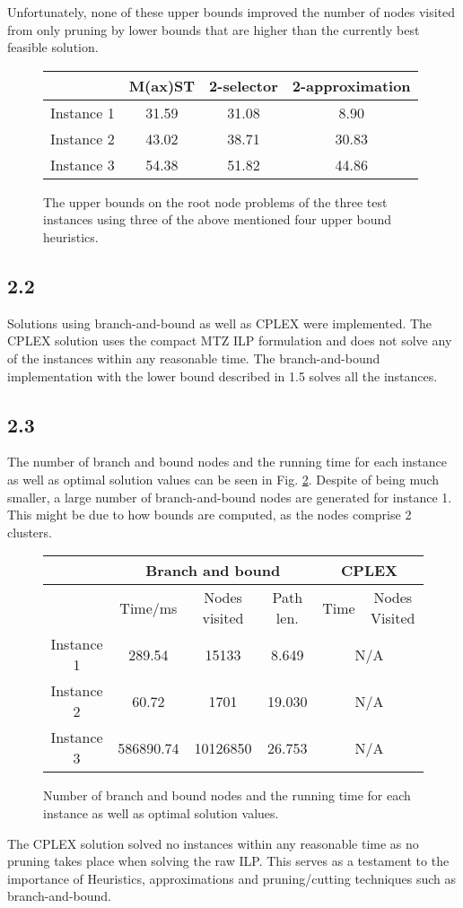 \documentclass[12pt]{article}
\begin{document}
Unfortunately, none of these upper bounds improved the number of nodes visited from only pruning by lower bounds that are higher than the currently best feasible solution. 
\begin{figure}[!hbt]
\center
\begin{tabular}{|c|c|c|c|}
\hline
&M(ax)ST & 2-selector & 2-approximation\\
\hline
Instance 1 & 31.59 & 31.08 & 8.90 \\
\hline
Instance 2 & 43.02 & 38.71 & 30.83\\
\hline
Instance 3 & 54.38 & 51.82 & 44.86\\
\hline
\end{tabular}
\caption{The upper bounds on the root node problems of the three test instances using three of the above mentioned four upper bound heuristics.\label{upperbounds}}
\end{figure}

\subsection*{2.2}
Solutions using branch-and-bound as well as CPLEX were implemented. The CPLEX solution uses the compact MTZ ILP formulation and does not solve any of the instances within any reasonable time. The branch-and-bound implementation with the lower bound described in 1.5 solves all the instances.

\subsection*{2.3}
The number of branch and bound nodes and the running time for each instance as well as optimal solution values can be seen in Fig. \ref{times}. Despite of being much smaller, a large number of branch-and-bound nodes are generated for instance 1. This might be due to how bounds are computed, as the nodes comprise 2 clusters.
\begin{figure}[!hbt]
\center
\begin{tabular}{|c | c | c | c | c | c |}
\hline
& \multicolumn{3}{|c|}{Branch and bound} & \multicolumn{2}{|c|}{CPLEX} \\
\hline 
& Time/ms & Nodes visited & Path len. & Time & Nodes Visited\\
\hline
Instance 1 & 289.54 & 15133 & 8.649 & \multicolumn{2}{|c|}{N/A} \\
\hline
Instance 2 & 60.72 & 1701 & 19.030 & \multicolumn{2}{|c|}{N/A} \\
\hline
Instance 3 & 586890.74 & 10126850 & 26.753 & \multicolumn{2}{|c|}{N/A} \\
\hline 
\end{tabular}
\caption{Number of branch and bound nodes and the running time for each instance as well as optimal solution values.
\label{times}}
\end{figure}
The CPLEX solution solved no instances within any reasonable time as no pruning takes place when solving the raw ILP. This serves as a testament to the importance of Heuristics, approximations and pruning/cutting techniques such as branch-and-bound.
\end{document}
